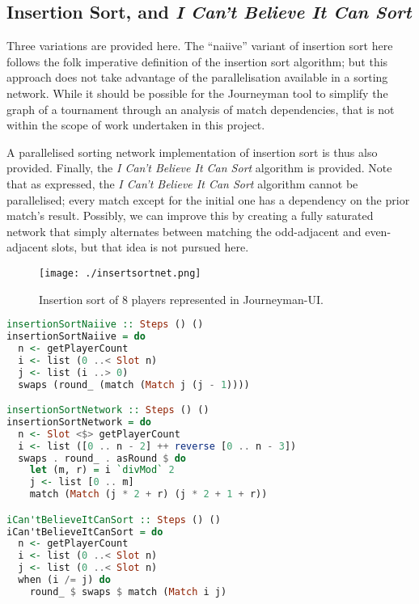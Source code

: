 \documentclass[a4,11pt,twoside,final,hidelinks]{article}
\begin{document}
\newpage
\subsection{Insertion Sort, and \emph{I Can't Believe It Can Sort}}
\label{sec:org08e2046}

Three variations are provided here. The ``naiive'' variant of insertion sort here
follows the folk imperative definition of the insertion sort algorithm; but this
approach does not take advantage of the parallelisation available in a sorting
network. While it should be possible for the Journeyman tool to simplify the
graph of a tournament through an analysis of match dependencies, that is not
within the scope of work undertaken in this project.

A parallelised sorting network implementation of insertion sort is thus also
provided. Finally, the \emph{I Can't Believe It Can Sort} algorithm is provided. Note
that as expressed, the \emph{I Can't Believe It Can Sort} algorithm cannot be
parallelised; every match except for the initial one has a dependency on the
prior match's result. Possibly, we can improve this by creating a fully
saturated network that simply alternates between matching the odd-adjacent and
even-adjacent slots, but that idea is not pursued here.

\begin{figure}[htbp]
\centering
\texttt{[image: ./insertsortnet.png]}
\caption{Insertion sort of 8 players represented in Journeyman-UI.}
\end{figure}

\begin{lstlisting}[language=haskell,numbers=none,basicstyle=\ttfamily\small]
insertionSortNaiive :: Steps () ()
insertionSortNaiive = do
  n <- getPlayerCount
  i <- list (0 ..< Slot n)
  j <- list (i ..> 0)
  swaps (round_ (match (Match j (j - 1))))

insertionSortNetwork :: Steps () ()
insertionSortNetwork = do
  n <- Slot <$> getPlayerCount
  i <- list ([0 .. n - 2] ++ reverse [0 .. n - 3])
  swaps . round_ . asRound $ do
    let (m, r) = i `divMod` 2
    j <- list [0 .. m]
    match (Match (j * 2 + r) (j * 2 + 1 + r))

iCan'tBelieveItCanSort :: Steps () ()
iCan'tBelieveItCanSort = do
  n <- getPlayerCount
  i <- list (0 ..< Slot n)
  j <- list (0 ..< Slot n)
  when (i /= j) do
    round_ $ swaps $ match (Match i j)
\end{lstlisting}

\newpage
\end{document}

